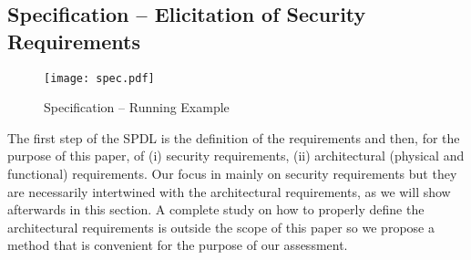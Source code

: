 \subsection{Specification -- Elicitation of Security Requirements}\label{sec:properties}
\begin{figure}[t]
	\centering
	\texttt{[image: spec.pdf]}
	\caption{Specification -- Running Example}
	\label{fig:spec}
\end{figure}
The first step of the SPDL is the definition of the requirements and then, for
the purpose of this paper, of (i) security requirements, (ii) architectural
(physical and functional) requirements.  Our focus in mainly on security
requirements but they are necessarily intertwined with the architectural
requirements, as we will show afterwards in this section.  A complete study on
how to properly define the architectural requirements is outside the scope of
this paper so we propose a method that is convenient for the purpose of our
assessment.

